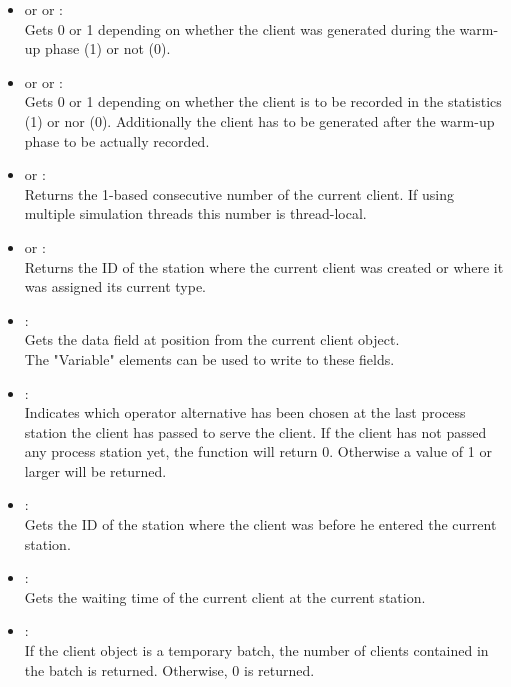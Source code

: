 \begin{itemize}

\item
{} or  or :\\
Gets 0 or 1 depending on whether the client was generated during the warm-up phase (1) or not (0).

\item
{} or  or :\\
Gets 0 or 1 depending on whether the client is to be recorded in the statistics (1) or nor (0). Additionally the client has to be generated after the warm-up phase to be actually recorded.

\item
{} or :\\
Returns the 1-based consecutive number of the current client. If using multiple simulation threads this number is thread-local.

\item
{} or :\\
Returns the ID of the station where the current client was created or where it was assigned its current type.

\item
{}:\\
Gets the data field at position  from the current client object.\\
The "Variable" elements can be used to write to these fields.

\item
{}:\\
Indicates which operator alternative has been chosen at the last process station the client has passed to serve the client. If the client has not passed any process station yet, the function will return 0. Otherwise a value of 1 or larger will be returned.

\item
{}:\\
Gets the ID of the station where the client was before he entered the current station.

\item
{}:\\
Gets the waiting time of the current client at the current station.

\item
{}:\\
If the client object is a temporary batch, the number of clients contained in the batch is returned. Otherwise, 0 is returned.

\end{itemize}



